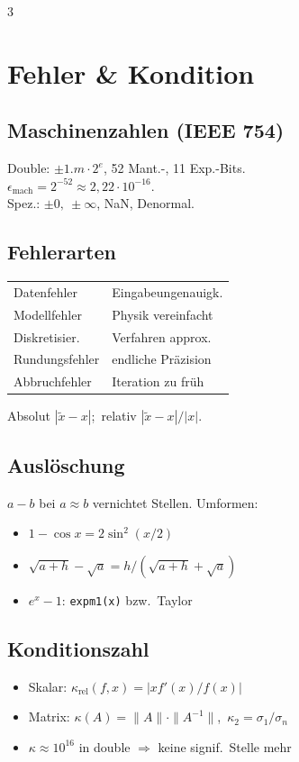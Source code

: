 \documentclass[8pt,a4paper]{extarticle}
\begin{document}

\begin{multicols*}{3}

\section{Fehler \& Kondition}
\subsection{Maschinenzahlen (IEEE 754)}
Double: $\pm 1.m\cdot 2^e$, 52 Mant.-, 11 Exp.-Bits.\\
$\epsilon_{\text{mach}}=2^{-52}\!\approx\!2{,}22\cdot 10^{-16}$.\\
Spez.: $\pm 0,\ \pm\infty$, NaN, Denormal.

\subsection{Fehlerarten}
\begin{tabularx}{\linewidth}{@{}l@{\ }X@{}}
Datenfehler & Eingabeungenauigk. \\
Modellfehler & Physik vereinfacht \\
Diskretisier.\ & Verfahren approx. \\
Rundungsfehler & endliche Pr\"azision \\
Abbruchfehler & Iteration zu fr\"uh \\
\end{tabularx}
Absolut $|\tilde x-x|$;\ relativ $|\tilde x-x|/|x|$.

\subsection{Ausl\"oschung}
$a-b$ bei $a\!\approx\!b$ vernichtet Stellen. Umformen:
\begin{itemize}
\item $1-\cos x = 2\sin^2(x/2)$
\item $\sqrt{a+h}-\sqrt a = h/(\sqrt{a+h}+\sqrt a)$
\item $e^x-1$: \texttt{expm1(x)} bzw.\ Taylor
\end{itemize}

\subsection{Konditionszahl}
\begin{itemize}
\item Skalar: $\kappa_{\text{rel}}(f,x)=|x f'(x)/f(x)|$
\item Matrix: $\kappa(A)=\|A\|\cdot\|A^{-1}\|$,\ $\kappa_2=\sigma_1/\sigma_n$
\item $\kappa\!\approx\!10^{16}$ in double $\Rightarrow$ keine signif.\ Stelle mehr
\end{itemize}


\end{multicols*}
\end{document}
